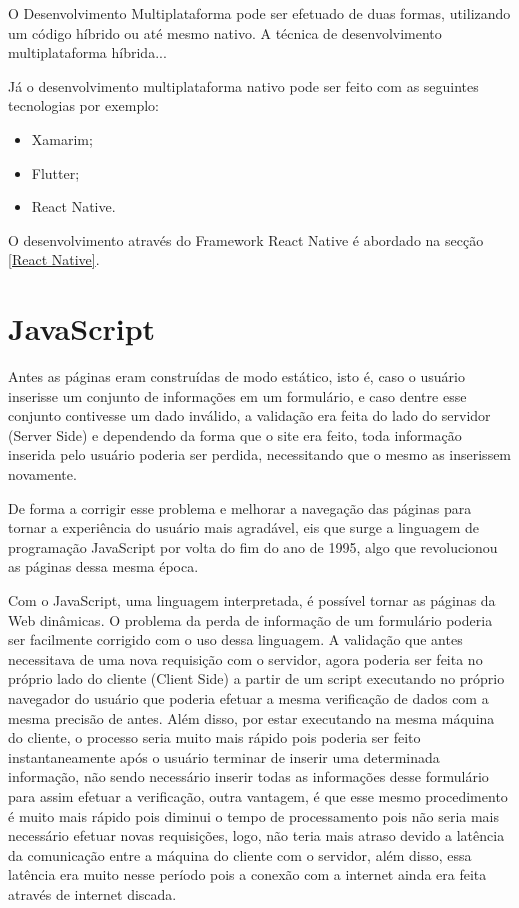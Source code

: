 O Desenvolvimento Multiplataforma pode ser efetuado de duas formas, utilizando um código híbrido ou até mesmo nativo.
A técnica de desenvolvimento multiplataforma híbrida...

Já o desenvolvimento multiplataforma nativo pode ser feito com as seguintes tecnologias por exemplo:

\begin{itemize}

\item Xamarim;
\item Flutter;
\item React Native.

\end{itemize}

O desenvolvimento através do Framework React Native é abordado na secção \ref{React Native}.

\section{JavaScript}\label{JavaScript}

Antes as páginas eram construídas de modo estático, isto é, caso o usuário inserisse um conjunto de informações em um formulário, e caso dentre esse conjunto contivesse um dado inválido, a validação era feita do lado do servidor (Server Side) e dependendo da forma que o site era feito, toda informação inserida pelo usuário poderia ser perdida, necessitando que o mesmo as inserissem novamente.

De forma a corrigir esse problema e melhorar a navegação das páginas para tornar a experiência do usuário mais agradável, eis que surge a linguagem de programação JavaScript por volta do fim do ano de 1995, algo que revolucionou as páginas dessa mesma época.

Com o JavaScript, uma linguagem interpretada, é possível tornar as páginas da Web dinâmicas. O problema da perda de informação de um formulário poderia ser facilmente corrigido com o uso dessa linguagem. A validação que antes necessitava de uma nova requisição com o servidor, agora poderia ser feita no próprio lado do cliente (Client Side) a partir de um script executando no próprio navegador do usuário que poderia efetuar a mesma verificação de dados com a mesma precisão de antes. Além disso, por estar executando na mesma máquina do cliente, o processo seria muito mais rápido pois poderia ser feito instantaneamente após o usuário terminar de inserir uma determinada informação, não sendo necessário inserir todas as informações desse formulário para assim efetuar a verificação, outra vantagem, é que esse mesmo procedimento é muito mais rápido pois diminui o tempo de processamento pois não seria mais necessário efetuar novas requisições, logo, não teria mais atraso devido a latência da comunicação entre a máquina do cliente com o servidor, além disso, essa latência era muito nesse período pois a conexão com a internet ainda era feita através de internet discada.

